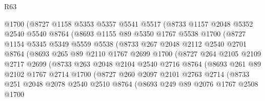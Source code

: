 \begin{lexlean}{R63}
\begin{coremodule}
              @1700
              (@8727
                @1158
                @5353
                @5357
                @5541
                @5517
                (@8733
                  @1157
                  @2048
                  @5352
                  @2540
                  @5540
                  @8764
                  (@8693
                    @1155
                    @89
                    @5350
                    @1767
                    @5538
                    @1700
                    (@8727
                      @1154
                      @5345
                      @5349
                      @5559
                      @5538
                      (@8733
                        @267
                        @2048
                        @2112
                        @2540
                        @2701
                        @8764
                        (@8693
                          @265
                          @89
                          @2110
                          @1767
                          @2699
                          @1700
                          (@8727
                            @264
                            @2105
                            @2109
                            @2717
                            @2699
                            (@8733
                              @263
                              @2048
                              @2104
                              @2540
                              @2716
                              @8764
                              (@8693
                                @261
                                @89
                                @2102
                                @1767
                                @2714
                                @1700
                                (@8727
                                  @260
                                  @2097
                                  @2101
                                  @2763
                                  @2714
                                  (@8733
                                    @251
                                    @2048
                                    @2078
                                    @2540
                                    @2510
                                    @8764
                                    (@8693
                                      @249
                                      @89
                                      @2076
                                      @1767
                                      @2508
                                      @1700

\end{coremodule}
\end{lexlean}
